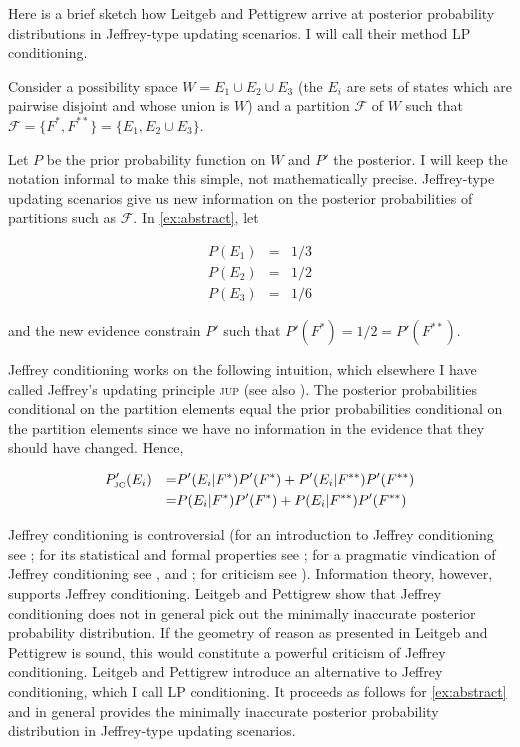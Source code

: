 \documentclass[smallextended]{svjour3}       %
\begin{document}
Here is a brief sketch how Leitgeb and Pettigrew arrive at posterior
probability distributions in Jeffrey-type updating scenarios. I will
call their method LP conditioning.

\begin{quotex}
  \label{ex:abstract} Consider a possibility
  space $W=E_{1}\cup{}E_{2}\cup{}E_{3}$ (the $E_{i}$ are sets of
  states which are pairwise disjoint and whose union is $W$) and a
  partition $\mathcal{F}$ of $W$ such that
  $\mathcal{F}=\{F^{*},F^{**}\}=\{E_{1},E_{2}\cup{}E_{3}\}$.
\end{quotex}

Let $P$ be the prior probability function on $W$ and $P'$ the
posterior. I will keep the notation informal to make this simple, not
mathematically precise. Jeffrey-type updating scenarios give us new
information on the posterior probabilities of partitions such as
$\mathcal{F}$. In {\xample} \ref{ex:abstract}, let

\begin{equation}
  \label{eq:priors}
  \begin{array}{rcl}
    P(E_{1})&=&1/3 \\
    P(E_{2})&=&1/2 \\
    P(E_{3})&=&1/6
  \end{array}
\end{equation}

and the new evidence constrain $P'$ such that
$P'(F^{*})=1/2=P'(F^{**})$.

Jeffrey conditioning works on the following intuition, which elsewhere
I have called Jeffrey's updating principle \textsc{jup} (see also
). The posterior probabilities conditional on the
partition elements equal the prior probabilities conditional on the
partition elements since we have no information in the evidence that
they should have changed. Hence,

\begin{align}
  \label{eq:jc}
  &P'_{\mbox{\tiny JC}}(E_{i})&=&P'(E_{i}|F^{*})P'(F^{*})+P'(E_{i}|F^{**})P'(F^{**})\notag \\
  &&=&P(E_{i}|F^{*})P'(F^{*})+P(E_{i}|F^{**})P'(F^{**})
\end{align}

Jeffrey conditioning is controversial (for an introduction to Jeffrey
conditioning see ; for its statistical and
formal properties see ; for a pragmatic
vindication of Jeffrey conditioning see , and
; for criticism see
). Information theory, however, supports
Jeffrey conditioning. Leitgeb and Pettigrew show that Jeffrey
conditioning does not in general pick out the minimally inaccurate
posterior probability distribution. If the geometry of reason as
presented in Leitgeb and Pettigrew is sound, this would constitute a
powerful criticism of Jeffrey conditioning. Leitgeb and Pettigrew
introduce an alternative to Jeffrey conditioning, which I call LP
conditioning. It proceeds as follows for {\xample} \ref{ex:abstract}
and in general provides the minimally inaccurate posterior probability
distribution in Jeffrey-type updating scenarios.
\end{document}
